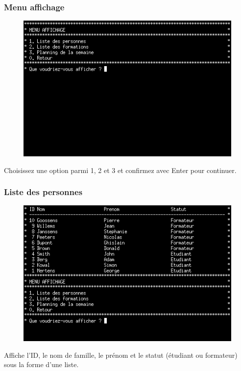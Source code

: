 \documentclass[11pt]{article}
\begin{document}
\subsubsection{Menu affichage}
\begin{figure}[ht]
  \centering
  \includegraphics[trim=0 190 0 0, clip, width=\textwidth]{images/02.png}
\end{figure}
Choisissez une option parmi 1, 2 et 3 et confirmez avec Enter pour continuer.

\newpage
\subsubsection{Liste des personnes}
\begin{figure}[ht]
  \centering
  \includegraphics[trim=0 40 0 0, clip, width=\textwidth]{images/03.png}
\end{figure}
Affiche l'ID, le nom de famille, le prénom et le statut (étudiant ou formateur) sous la forme d'une liste.
\end{document}
